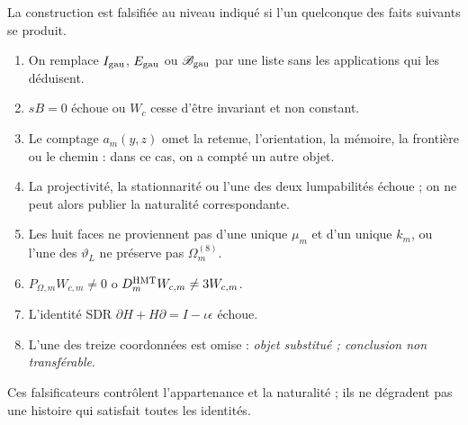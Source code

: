 \begin{ablation}
\label{abl:gauint-falsadores}
La construction est falsifiée au niveau indiqué si l'un quelconque des
faits suivants se produit.
\begin{enumerate}
 \item On remplace \(I_{\rm gau}\), \(E_{\rm gau}\) ou
 \(\mathscr B_{\rm gau}\) par une liste sans les applications qui les déduisent.
 \item \(sB=0\) échoue ou \(W_c\) cesse d'être invariant et non constant.
 \item Le comptage \(a_m(y,z)\) omet la retenue, l'orientation, la mémoire, la frontière ou
 le chemin : dans ce cas, on a compté un autre objet.
 \item La projectivité, la stationnarité ou l'une des deux
 lumpabilités échoue ; on ne peut alors publier la naturalité correspondante.
 \item Les huit faces ne proviennent pas d'une unique \(\mu_m\) et d'un unique
 \(k_m\), ou l'une des \(\vartheta_L\) ne préserve pas \(\Omega_m^{(8)}\).
 \item \(P_{\Omega,m}W_{c,m}\ne0\) o
 \(D_m^{\rm HMT}W_{c,m}\ne3W_{c,m}\).
 \item L'identité SDR \(\partial H+H\partial=I-\iota\epsilon\) échoue.
 \item L'une des treize coordonnées est omise : \emph{objet substitué ;
 conclusion non transférable}.
\end{enumerate}
Ces falsificateurs contrôlent l'appartenance et la naturalité ; ils ne dégradent pas une
histoire qui satisfait toutes les identités.
\end{ablation}
\fi
